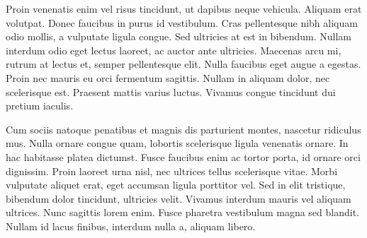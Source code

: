 Proin venenatis enim vel risus tincidunt, ut dapibus neque vehicula. Aliquam erat volutpat. Donec faucibus in purus id vestibulum. Cras pellentesque nibh aliquam odio mollis, a vulputate ligula congue. Sed ultricies at est in bibendum. Nullam interdum odio eget lectus laoreet, ac auctor ante ultricies. Maecenas arcu mi, rutrum at lectus et, semper pellentesque elit. Nulla faucibus eget augue a egestas. Proin nec mauris eu orci fermentum sagittis. Nullam in aliquam dolor, nec scelerisque est. Praesent mattis varius luctus. Vivamus congue tincidunt dui pretium iaculis.

Cum sociis natoque penatibus et magnis dis parturient montes, nascetur ridiculus mus. Nulla ornare congue quam, lobortis scelerisque ligula venenatis ornare. In hac habitasse platea dictumst. Fusce faucibus enim ac tortor porta, id ornare orci dignissim. Proin laoreet urna nisl, nec ultrices tellus scelerisque vitae. Morbi vulputate aliquet erat, eget accumsan ligula porttitor vel. Sed in elit tristique, bibendum dolor tincidunt, ultricies velit. Vivamus interdum mauris vel aliquam ultrices. Nunc sagittis lorem enim. Fusce pharetra vestibulum magna sed blandit. Nullam id lacus finibus, interdum nulla a, aliquam libero.
